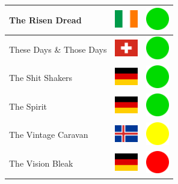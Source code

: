 \documentclass[12pt, a4paper, twoside]{report}
\begin{document}
\begin{center}
\begin{longtable}{|p{5cm}|p{2cm}|p{2cm}|}
 The Risen Dread                                            & \includegraphics[width=1cm]{../4x3/ie} &   \includegraphics[width=1cm]{../likes/y} \\ \hline
 These Days \& Those Days                                   & \includegraphics[width=1cm]{../4x3/ch} &   \includegraphics[width=1cm]{../likes/y} \\ \hline
 The Shit Shakers                                           & \includegraphics[width=1cm]{../4x3/de} &   \includegraphics[width=1cm]{../likes/y} \\ \hline
 The Spirit                                                 & \includegraphics[width=1cm]{../4x3/de} &   \includegraphics[width=1cm]{../likes/y} \\ \hline
 The Vintage Caravan                                        & \includegraphics[width=1cm]{../4x3/is} &   \includegraphics[width=1cm]{../likes/m} \\ \hline
 The Vision Bleak                                           & \includegraphics[width=1cm]{../4x3/de} &   \includegraphics[width=1cm]{../likes/n} \\ \hline

\end{longtable}
\end{center}
\end{document}
